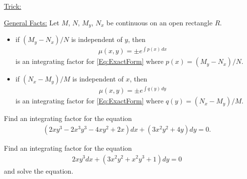 \documentclass[12pt,a4paper]{article}
\newcounter{example}[section]
\begin{document}
\underline{Trick:}

\vfill

\underline{General Facts:}
Let $M$, $N$, $M_y$, $N_x$ be continuous on an open rectangle $R$.
	\begin{itemize}
	\item if $(M_y - N_x)/N$ is independent of $y$, then
		\begin{align*}
		\mu (x, y) = \pm e^{\int p (x) \, dx}
		\end{align*}
	is an integrating factor for \eqref{Eq:ExactForm} where $p(x) = (M_y - N_x)/N$.
	\item if $(N_x - M_y)/M$ is independent of $x$, then
		\begin{align*}
		\mu (x, y) = \pm e^{\int q (y) \, dy}
		\end{align*}
	is an integrating factor for \eqref{Eq:ExactForm} where $q(y) = (N_x - M_y)/M$.
	\end{itemize}
	
\newpage

\begin{example}
Find an integrating factor for the equation
	\begin{align*}
	(2xy^3 - 2x^3 y^3 - 4xy^2 + 2x) dx + (3x^2y^2 + 4y) dy = 0 .
	\end{align*}
\end{example}

\newpage

\begin{example}
Find an integrating factor for the equation
	\begin{align*}
	2xy^3 dx + (3x^2y^2 + x^2 y^3 + 1) dy = 0 
	\end{align*}
and solve the equation.
\end{example}

\newpage

\phantom{2}
\end{document}
